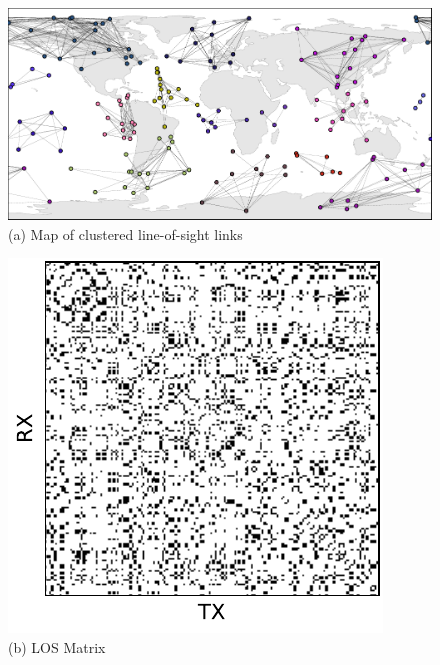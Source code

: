 \documentclass[conference]{IEEEtran}
\begin{document}
\begin{figure}[t!]
  \begin{minipage}[b]{\linewidth}
    \begin{center}
      \includegraphics[width=\textwidth]{images/clusters.pdf} \\
      {\footnotesize(a) Map of clustered line-of-sight links}
    \end{center}
    \medskip
  \end{minipage}
  \begin{minipage}[b]{0.32\linewidth}
    \begin{center}
      \includegraphics[width=\textwidth]{images/los_matrix.pdf} \\
      {\footnotesize(b) LOS Matrix}

\end{center}
\end{minipage}
\end{figure}
\end{document}
